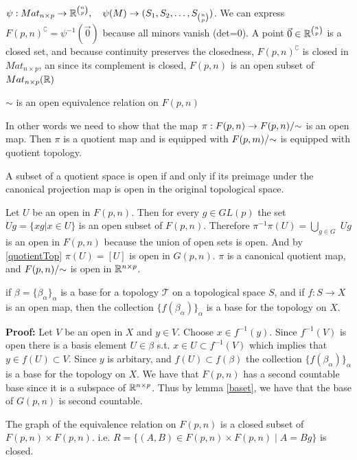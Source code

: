 \documentclass[11pt,a4paper]{report}
\begin{document}
$ \psi: Mat_{n \times p} \to \mathbb{R}^{ n \choose p}, \quad \psi(M) \to (S_1,S_2, \dots, S_{n \choose p})$.
We can express $F(p,n)^\complement = \psi ^{-1} ( \vec{0} )$ because all minors vanish (det=0).
A point $ \vec{0} \in \mathbb{R}^{n \choose p}$ is a closed set, and because continuity preserves the closedness, $F(p,n)^\complement$ is closed in $Mat_{n \times p}$,
an since its complement is closed, $F(p,n)$ is an open subset of $Mat_{n \times p}(\mathbb{R})$
\begin{Prop}
    $\sim$ is an open equivalence relation on $F(p,n)$
\end{Prop}
In other words we need to show that the map $\pi: F(p,n) \to F(p,n)/{\sim}$ is an open map.
Then $\pi$ is a quotient map and is equipped with $F(p,m)/{\sim}$ is equipped with quotient topology.
\newline
\begin{Lemma} \label{quotientTop}
    A subset of a quotient space is open if and only if its
    preimage under the canonical projection map is open in the original topological space.
\end{Lemma}
Let $U$ be an open in $F(p,n)$. Then for every $g \in GL(p)$ the set $U g = \{ x g | x \in U \}$ is an open subset of $F(p,n)$.
Therefore $\pi^{-1}\pi(U) = \displaystyle \bigcup_{g \in G} \; U g$ is an open in $F(p,n)$ because the union of open sets is open.
And by \ref{quotientTop} $\pi(U) = [U]$ is open in $G(p,n)$. $\pi$ is a canonical quotient map, and $F(p,n)/{\sim}$ is open in $\mathbb{R}^{n \times p}$. 
\begin{Lemma}
    \label{baset}
    if $\beta = \{ \beta_\alpha \}_\alpha$ is a base for a topology $\mathcal{T}$ on a topological space $S$,
    and if $f: S \to X$ is an open map, then the collection $\{ f (\beta_\alpha) \}_\alpha$ is a base for the topology on $X$.
\end{Lemma}
\textbf{Proof:} Let $V$ be an open in $X$ and $y \in V$. Choose $x \in f^{-1}(y)$. 
Since $f^{-1} (V)$ is open there is a basis element $U \in \beta$ s.t. $x \in U \subset f^{-1}(V)$
which implies that $y \in f(U) \subset V$. Since $y$ is arbitary, and $f(U) \subset f(\beta)$ the collection $\{ f (\beta_\alpha) \}_\alpha$ is a base for the topology on $X$.
\newline
\newline
We have that $F(p,n)$ has a second countable base since it is a subspace of $\mathbb{R}^{n \times p}$.
Thus by lemma \ref{baset}, we have that the base of $G(p,n)$ is second countable.
\begin{Prop}
The graph of the equivalence relation on $F(p,n)$ is a closed subset of $F(p,n) \times F(p,n)$. i.e. $ R = \{ (A,B) \in F(p,n) \times F(p,n) \; | \; A = Bg \}$ is closed.
\end{Prop}
\end{document}
